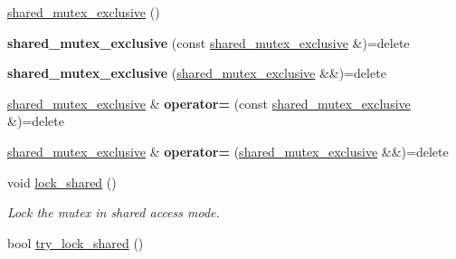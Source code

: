 \begin{DoxyCompactItemize}
\item 
\hyperlink{classcpen333_1_1thread_1_1impl_1_1shared__mutex__exclusive_a8eb9b361f1c0fc4533ca9283c376a2ae}{shared\+\_\+mutex\+\_\+exclusive} ()
\item 
\mbox{\label{classcpen333_1_1thread_1_1impl_1_1shared__mutex__exclusive_a5e9fb260570f5219a8804080863aa2b6}} 
{\bfseries shared\+\_\+mutex\+\_\+exclusive} (const \hyperlink{classcpen333_1_1thread_1_1impl_1_1shared__mutex__exclusive}{shared\+\_\+mutex\+\_\+exclusive} \&)=delete
\item 
\mbox{\label{classcpen333_1_1thread_1_1impl_1_1shared__mutex__exclusive_a0c8bcfcb346c303f9bee391e8e6b3cf7}} 
{\bfseries shared\+\_\+mutex\+\_\+exclusive} (\hyperlink{classcpen333_1_1thread_1_1impl_1_1shared__mutex__exclusive}{shared\+\_\+mutex\+\_\+exclusive} \&\&)=delete
\item 
\mbox{\label{classcpen333_1_1thread_1_1impl_1_1shared__mutex__exclusive_af38400b4bc513226c396ab395d828e7f}} 
\hyperlink{classcpen333_1_1thread_1_1impl_1_1shared__mutex__exclusive}{shared\+\_\+mutex\+\_\+exclusive} \& {\bfseries operator=} (const \hyperlink{classcpen333_1_1thread_1_1impl_1_1shared__mutex__exclusive}{shared\+\_\+mutex\+\_\+exclusive} \&)=delete
\item 
\mbox{\label{classcpen333_1_1thread_1_1impl_1_1shared__mutex__exclusive_a85df250fa695499f02f687eb1d9ea37b}} 
\hyperlink{classcpen333_1_1thread_1_1impl_1_1shared__mutex__exclusive}{shared\+\_\+mutex\+\_\+exclusive} \& {\bfseries operator=} (\hyperlink{classcpen333_1_1thread_1_1impl_1_1shared__mutex__exclusive}{shared\+\_\+mutex\+\_\+exclusive} \&\&)=delete
\item 
void \hyperlink{classcpen333_1_1thread_1_1impl_1_1shared__mutex__exclusive_ae934ab0e0518a0c0d4a220701f091073}{lock\+\_\+shared} ()
\begin{DoxyCompactList}\small\item\em Lock the mutex in shared access mode. \end{DoxyCompactList}\item 
bool \hyperlink{classcpen333_1_1thread_1_1impl_1_1shared__mutex__exclusive_ae1ca68cd6c5b0f5b14dde5ef52fe126a}{try\+\_\+lock\+\_\+shared} ()

\end{DoxyCompactItemize}
